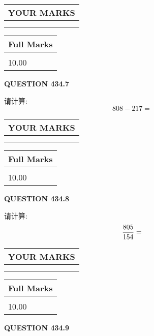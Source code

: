 \documentclass{ctexart}
\begin{document}
 

 
  
\vspace{0.2in}
  
\noindent\begin{tabular}{|l|}
\hline
 YOUR MARKS  \\
\hline
 \\ 
 \\ 
\hline
\end{tabular}
\hspace{0.05in} \begin{tabular}{|l|}
\hline
 Full Marks  \\
\hline
 \\ 
10.00 \\
\hline
\end{tabular}
{\textbf{\Large{QUESTION
434.7 
}}}
  
  
 
请计算:
\begin{equation}
808 -   %
217 = \nonumber
\end{equation}
 

 

 
  
\vspace{0.2in}
  
\noindent\begin{tabular}{|l|}
\hline
 YOUR MARKS  \\
\hline
 \\ 
 \\ 
\hline
\end{tabular}
\hspace{0.05in} \begin{tabular}{|l|}
\hline
 Full Marks  \\
\hline
 \\ 
10.00 \\
\hline
\end{tabular}
{\textbf{\Large{QUESTION
434.8 
}}}
  
  
 
请计算:
\begin{equation}
\frac { %
805 }  {  %
154} = \nonumber
\end{equation}
 

 

 
  
\vspace{0.2in}
  
\noindent\begin{tabular}{|l|}
\hline
 YOUR MARKS  \\
\hline
 \\ 
 \\ 
\hline
\end{tabular}
\hspace{0.05in} \begin{tabular}{|l|}
\hline
 Full Marks  \\
\hline
 \\ 
10.00 \\
\hline
\end{tabular}
{\textbf{\Large{QUESTION
434.9 
}}}
  
\end{document}

